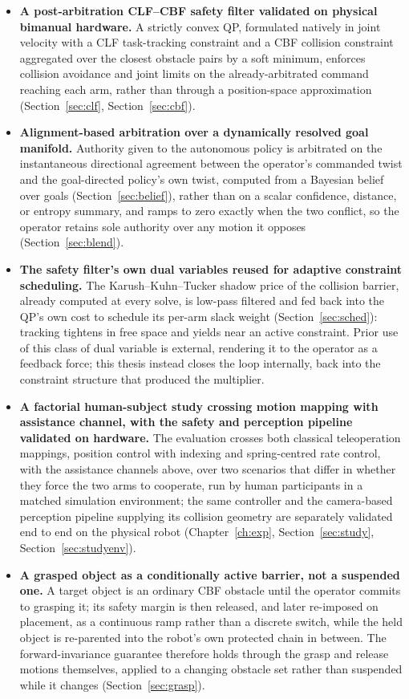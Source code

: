 \documentclass[12pt,a4paper,twoside,openright]{report}
\begin{document}
\begin{itemize}[nosep]
\item \textbf{A post-arbitration CLF--CBF safety filter validated on physical bimanual hardware.} A strictly convex QP, formulated natively in joint velocity with a CLF task-tracking constraint and a CBF collision constraint aggregated over the closest obstacle pairs by a soft minimum, enforces collision avoidance and joint limits on the already-arbitrated command reaching each arm, rather than through a position-space approximation (Section~\ref{sec:clf}, Section~\ref{sec:cbf}).
\item \textbf{Alignment-based arbitration over a dynamically resolved goal manifold.} Authority given to the autonomous policy is arbitrated on the instantaneous directional agreement between the operator's commanded twist and the goal-directed policy's own twist, computed from a Bayesian belief over goals (Section~\ref{sec:belief}), rather than on a scalar confidence, distance, or entropy summary, and ramps to zero exactly when the two conflict, so the operator retains sole authority over any motion it opposes (Section~\ref{sec:blend}).
\item \textbf{The safety filter's own dual variables reused for adaptive constraint scheduling.} The Karush--Kuhn--Tucker shadow price of the collision barrier, already computed at every solve, is low-pass filtered and fed back into the QP's own cost to schedule its per-arm slack weight (Section~\ref{sec:sched}): tracking tightens in free space and yields near an active constraint. Prior use of this class of dual variable is external, rendering it to the operator as a feedback force; this thesis instead closes the loop internally, back into the constraint structure that produced the multiplier.
\item \textbf{A factorial human-subject study crossing motion mapping with assistance channel, with the safety and perception pipeline validated on hardware.} The evaluation crosses both classical teleoperation mappings, position control with indexing and spring-centred rate control, with the assistance channels above, over two scenarios that differ in whether they force the two arms to cooperate, run by human participants in a matched simulation environment; the same controller and the camera-based perception pipeline supplying its collision geometry are separately validated end to end on the physical robot (Chapter~\ref{ch:exp}, Section~\ref{sec:study}, Section~\ref{sec:studyenv}).
\item \textbf{A grasped object as a conditionally active barrier, not a suspended one.} A target object is an ordinary CBF obstacle until the operator commits to grasping it; its safety margin is then released, and later re-imposed on placement, as a continuous ramp rather than a discrete switch, while the held object is re-parented into the robot's own protected chain in between. The forward-invariance guarantee therefore holds through the grasp and release motions themselves, applied to a changing obstacle set rather than suspended while it changes (Section~\ref{sec:grasp}).
\end{itemize}
\end{document}
